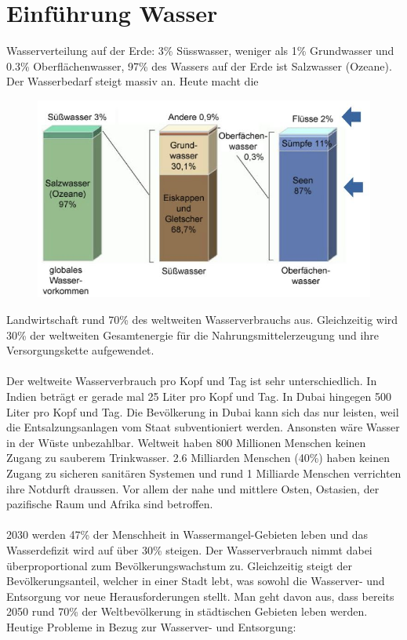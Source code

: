 \documentclass[9pt, openright=false]{scrartcl}
\begin{document}
\section{Einführung Wasser}
Wasserverteilung auf der Erde: 3\% Süsswasser, weniger als 1\% Grundwasser und 0.3\% Oberflächenwasser, 97\% des Wassers auf der Erde ist Salzwasser (Ozeane). Der Wasserbedarf steigt massiv an. Heute macht die
\begin{figure} 
  \includegraphics[width=.5\textwidth]{images/wasservetreilung}
\end{figure} Landwirtschaft rund 70\% des weltweiten Wasserverbrauchs aus. Gleichzeitig wird 30\% der weltweiten Gesamtenergie für die Nahrungsmittelerzeugung und ihre Versorgungskette aufgewendet.\\ \\
Der weltweite Wasserverbrauch pro Kopf und Tag ist sehr unterschiedlich. In Indien beträgt er gerade mal 25 Liter pro Kopf und Tag. In Dubai hingegen 500 Liter pro Kopf und Tag. Die Bevölkerung in Dubai kann sich das nur leisten, weil die Entsalzungsanlagen vom Staat subventioniert werden. Ansonsten wäre Wasser in der Wüste unbezahlbar. Weltweit haben 800 Millionen Menschen keinen Zugang zu sauberem Trinkwasser. 2.6 Milliarden Menschen (40\%) haben keinen Zugang zu sicheren sanitären Systemen und rund 1 Milliarde Menschen verrichten ihre Notdurft draussen. Vor allem der nahe und mittlere Osten, Ostasien, der pazifische Raum und Afrika sind betroffen.\\ \\
2030 werden 47\% der Menschheit in Wassermangel-Gebieten leben und das Wasserdefizit wird auf über 30\% steigen. Der Wasserverbrauch nimmt dabei überproportional zum Bevölkerungswachstum zu. Gleichzeitig steigt der Bevölkerungsanteil, welcher in einer Stadt lebt, was sowohl die Wasserver- und Entsorgung vor neue Herausforderungen stellt. Man geht davon aus, dass bereits 2050 rund 70\% der Weltbevölkerung in städtischen Gebieten leben werden. Heutige Probleme in Bezug zur Wasserver- und Entsorgung:
\end{document}
